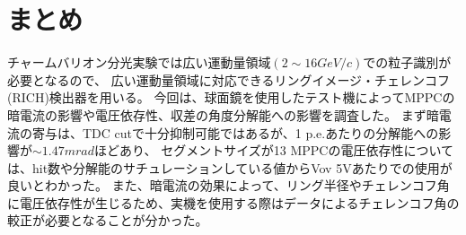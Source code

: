 \documentclass[uplatex, titlepage, dvipdfmx, 12pt, a4paper]{jsreport}
\begin{document}
\chapter{まとめ}
    チャームバリオン分光実験では広い運動量領域$\left(2\sim16\si{GeV/c}\right)$での粒子識別が必要となるので、
    広い運動量領域に対応できるリングイメージ・チェレンコフ(RICH)検出器を用いる。
    今回は、球面鏡を使用したテスト機によってMPPCの暗電流の影響や電圧依存性、収差の角度分解能への影響を調査した。
    まず暗電流の寄与は、TDC cutで十分抑制可能ではあるが、1 p.e.あたりの分解能への影響が$\sim1.47\si{mrad}$ほどあり、
    セグメントサイズが13%
    MPPCの電圧依存性については、hit数や分解能のサチュレーションしている値からVov 5Vあたりでの使用が良いとわかった。
    また、暗電流の効果によって、リング半径やチェレンコフ角に電圧依存性が生じるため、実機を使用する際はデータによるチェレンコフ角の較正が必要となることが分かった。
\end{document}
